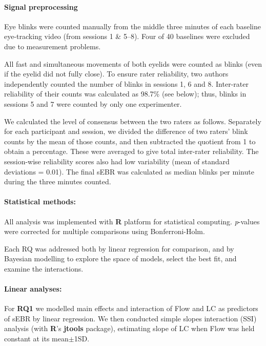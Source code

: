 \documentclass[10pt,letterpaper,floatsintext]{article}
\begin{document}
\paragraph{Signal preprocessing}
Eye blinks were counted manually from the middle three minutes of each baseline eye-tracking video (from sessions 1 \& 5--8). Four of 40 baselines were excluded due to measurement problems.

All fast and simultaneous movements of both eyelids were counted as blinks (even if the eyelid did not fully close). To ensure rater reliability, two authors independently counted the number of blinks in sessions 1, 6 and 8. Inter-rater reliability of their counts was calculated as 98.7\% (see below); thus, blinks in sessions 5 and 7 were counted by only one experimenter.

We calculated the level of consensus between the two raters as follows. Separately for each participant and session, we divided the difference of two raters' blink counts by the mean of those counts, and then subtracted the quotient from 1 to obtain a percentage. These were averaged to give total inter-rater reliability. The session-wise reliability scores also had low variability (mean of standard deviations = 0.01). The final sEBR was calculated as median blinks per minute during the three minutes counted.

\paragraph{Statistical methods:}
All analysis was implemented with {\bf R} platform for statistical computing. {\it p}-values were corrected for multiple comparisons using Bonferroni-Holm.%

Each RQ was addressed both by linear regression for comparison, and by Bayesian modelling to explore the space of models, select the best fit, and examine the interactions. 

\paragraph{Linear analyses:}
For {\bf RQ1} we modelled main effects and interaction of Flow and LC as predictors of sEBR by linear regression. We then conducted simple slopes interaction (SSI) analysis (with {\bf R}'s {\bf jtools} package), estimating slope of LC when Flow was held constant at its mean$\pm$1SD. 
\end{document}
